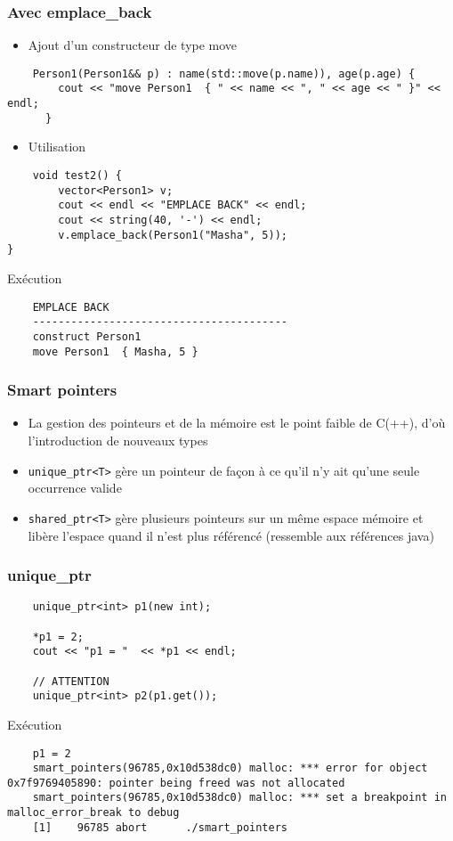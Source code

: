 \begin{frame}[fragile]
\frametitle{Avec emplace\_back}
\begin{itemize}
    \item Ajout d'un constructeur de type move
\end{itemize}
\begin{lstlisting}
    Person1(Person1&& p) : name(std::move(p.name)), age(p.age) {
        cout << "move Person1  { " << name << ", " << age << " }" << endl;
      }
\end{lstlisting}
\begin{itemize}
    \item Utilisation
\end{itemize}
\begin{lstlisting}
    void test2() {
        vector<Person1> v;
        cout << endl << "EMPLACE BACK" << endl; 
        cout << string(40, '-') << endl;
        v.emplace_back(Person1("Masha", 5));
}    
\end{lstlisting}
\begin{exampleblock}{Exécution}
\begin{verbatim}
    EMPLACE BACK
    ----------------------------------------
    construct Person1
    move Person1  { Masha, 5 }
\end{verbatim}
\end{exampleblock}
\end{frame}

\begin{frame}[fragile]
\frametitle{Smart pointers}
    \begin{itemize}
        \item La gestion des pointeurs et de la mémoire est le point faible de C(++), d'où l'introduction de nouveaux types 
        \item \texttt{unique\_ptr<T>} gère un pointeur de façon à ce qu'il n'y ait qu'une seule occurrence valide 
        \item \texttt{shared\_ptr<T>} gère plusieurs pointeurs sur un même espace mémoire et libère l'espace quand il n'est plus référencé (ressemble aux références java)
    \end{itemize}
\end{frame}

\begin{frame}[fragile]
\frametitle{unique\_ptr}
\begin{lstlisting}
    unique_ptr<int> p1(new int); 

    *p1 = 2;
    cout << "p1 = "  << *p1 << endl;

    // ATTENTION
    unique_ptr<int> p2(p1.get());
\end{lstlisting}
\begin{exampleblock}{Exécution}
    {\tiny}
    \begin{verbatim}        
    p1 = 2
    smart_pointers(96785,0x10d538dc0) malloc: *** error for object 0x7f9769405890: pointer being freed was not allocated
    smart_pointers(96785,0x10d538dc0) malloc: *** set a breakpoint in malloc_error_break to debug
    [1]    96785 abort      ./smart_pointers    
\end{verbatim}
\end{exampleblock}
\end{frame}

